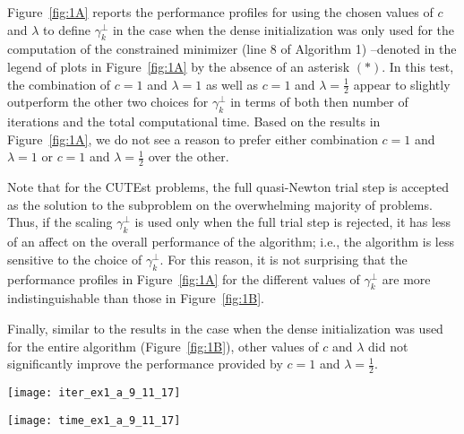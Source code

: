 Figure~\ref{fig:1A} reports the 
performance profiles for 
using the chosen values of $c$ and $\lambda$ to define $\gamma_k^{\perp}$ 
in the case when 
the dense initialization 
was only used for the
computation of the constrained minimizer (line 8 of Algorithm 1)
--denoted in the legend of plots in
Figure~\ref{fig:1A} by the absence of an asterisk $ (*)$.
In this test, the combination of
$c=1$ and $\lambda=1$  as well as 
$c=1$ and $\lambda=\frac{1}{2}$
appear to slightly outperform
the other two choices for  $\gamma^\perp_k$ in terms of both
then number of iterations and the total computational time.
Based on the results in Figure~\ref{fig:1A}, 
we do not see a reason to prefer either
combination $c=1$ and $\lambda=1$ or
$c=1$ and $\lambda=\frac{1}{2}$
over the other.

Note that for the {\small CUTE}st problems, the full quasi-Newton trial step is accepted
as the solution to the subproblem
on the overwhelming
majority of problems. Thus, if the scaling $\gamma_k^\perp$ is
used only when the full trial step is rejected, it has less of an affect
on the overall performance of the algorithm; i.e., the algorithm is less
sensitive to the choice of $\gamma_k^\perp$.  For this reason, it is not
surprising that the performance profiles in Figure~\ref{fig:1A}
for the different values
of $\gamma_k^\perp$ are more indistinguishable than those in
Figure~\ref{fig:1B}. 

Finally, similar to the results in the case when the dense initialization
was used for the entire algorithm (Figure~\ref{fig:1B}), other values of
$c$ and $\lambda$ did not significantly improve the performance
provided by $c=1$ and $\lambda=\frac{1}{2}$.

	\begin{figure*}[h!]
				\begin{minipage}{0.48\textwidth}
					\texttt{[image: iter\_ex1\_a\_9\_11\_17]}
				\end{minipage}
				\hfill
				\begin{minipage}{0.48\textwidth}
							\texttt{[image: time\_ex1\_a\_9\_11\_17]}
				\end{minipage}
				\caption{
Performance profiles comparing \texttt{iter} (left) and \texttt{time} (right)  
for the different values of $\gamma_k^\perp$
given in Table~\ref{table:gammaperp-JE}. 
In the legend, $\widehat{B}_0(c,\lambda)$ denotes the results from 
using the dense initialization
with the given values for $c$ and $\lambda$ to define $\gamma_k^\perp$.
 In this experiment, the dense initialization
was only used for the computation of the constrained minimizer (line 8 of Algorithm 1).}
			\label{fig:1A}       
	\end{figure*}
		


